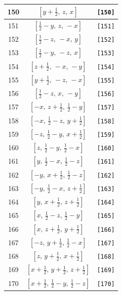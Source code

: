 \documentclass[fleqn,8pt]{jsarticle}
\begin{document}
\begin{longtable}{ccc}
150 & $\left[ y + \frac{1}{2},\, z,\, x \right]$ & {\tt [150]} \\ \hline
151 & $\left[ \frac{1}{2} - y,\, z,\, - x \right]$ & {\tt [151]} \\ \hline
152 & $\left[ \frac{1}{2} - z,\, - x,\, y \right]$ & {\tt [152]} \\ \hline
153 & $\left[ \frac{1}{2} - y,\, - z,\, x \right]$ & {\tt [153]} \\ \hline
154 & $\left[ z + \frac{1}{2},\, - x,\, - y \right]$ & {\tt [154]} \\ \hline
155 & $\left[ y + \frac{1}{2},\, - z,\, - x \right]$ & {\tt [155]} \\ \hline
156 & $\left[ \frac{1}{2} - z,\, x,\, - y \right]$ & {\tt [156]} \\ \hline
157 & $\left[ - x,\, z + \frac{1}{2},\, \frac{1}{2} - y \right]$ & {\tt [157]} \\ \hline
158 & $\left[ - x,\, \frac{1}{2} - z,\, y + \frac{1}{2} \right]$ & {\tt [158]} \\ \hline
159 & $\left[ - z,\, \frac{1}{2} - y,\, x + \frac{1}{2} \right]$ & {\tt [159]} \\ \hline
160 & $\left[ z,\, \frac{1}{2} - y,\, \frac{1}{2} - x \right]$ & {\tt [160]} \\ \hline
161 & $\left[ y,\, \frac{1}{2} - x,\, \frac{1}{2} - z \right]$ & {\tt [161]} \\ \hline
162 & $\left[ - y,\, x + \frac{1}{2},\, \frac{1}{2} - z \right]$ & {\tt [162]} \\ \hline
163 & $\left[ - y,\, \frac{1}{2} - x,\, z + \frac{1}{2} \right]$ & {\tt [163]} \\ \hline
164 & $\left[ y,\, x + \frac{1}{2},\, z + \frac{1}{2} \right]$ & {\tt [164]} \\ \hline
165 & $\left[ x,\, \frac{1}{2} - z,\, \frac{1}{2} - y \right]$ & {\tt [165]} \\ \hline
166 & $\left[ x,\, z + \frac{1}{2},\, y + \frac{1}{2} \right]$ & {\tt [166]} \\ \hline
167 & $\left[ - z,\, y + \frac{1}{2},\, \frac{1}{2} - x \right]$ & {\tt [167]} \\ \hline
168 & $\left[ z,\, y + \frac{1}{2},\, x + \frac{1}{2} \right]$ & {\tt [168]} \\ \hline
169 & $\left[ x + \frac{1}{2},\, y + \frac{1}{2},\, z + \frac{1}{2} \right]$ & {\tt [169]} \\ \hline
170 & $\left[ x + \frac{1}{2},\, \frac{1}{2} - y,\, \frac{1}{2} - z \right]$ & {\tt [170]} \\ \hline

\end{longtable}
\end{document}
